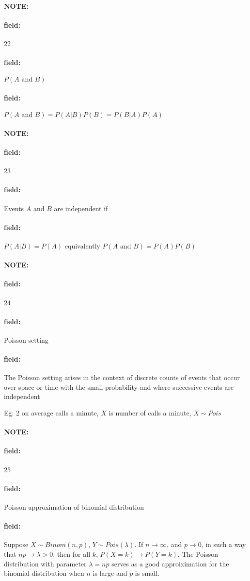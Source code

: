 \documentclass[12pt]{article}
\newenvironment{note}{\paragraph{NOTE:}}{}
\newenvironment{field}{\paragraph{field:}}{}
\begin{document}
\begin{note}
  \begin{field}
    \tiny 22
  \end{field}
  \begin{field}
    $P(A \text{ and }B)$
  \end{field}
  \begin{field}
    $P(A \text{ and }B) = P(A|B)P(B) = P(B|A)P(A)$
  \end{field}
\end{note}



\begin{note}
  \begin{field}
    \tiny 23
  \end{field}
  \begin{field}
    Events $A$ and $B$ are independent if
  \end{field}
  \begin{field}
    $P(A|B) = P(A)$ equivalently $P(A \text{ and } B)  = P(A)P(B)$
  \end{field}
\end{note}

\begin{note}
  \begin{field}
    \tiny 24
  \end{field}
  \begin{field}
    Poisson setting
  \end{field}
  \begin{field}
    The Poisson setting arises in the context of discrete counts of events that occur over space or time with the small probability and where successive events are independent

    Eg: 2 on average calls a minute, $X$ is number of calls a minute, $X \sim Pois $
  \end{field}
\end{note}

\begin{note}
  \begin{field}
    \tiny 25
  \end{field}
  \begin{field}
    Poisson approximation of binomial distribution
  \end{field}
  \begin{field}
    Suppose $X \sim Binom(n,p)$, $Y \sim Pois (\lambda)$. If $n\to \infty$, and $p \to 0$, in such a way that $np \to \lambda > 0$, then for all $k$, $P(X = k) \to P(Y = k)$. The Poisson distribution with parameter $\lambda = np$ serves as a good approiximation for the binomial distribution when $n$ is large and $p$ is small.
  \end{field}
\end{note}
\end{document}
